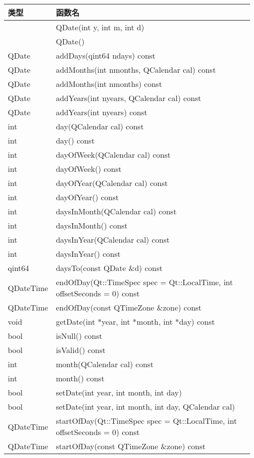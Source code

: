 \begin{longtable}{|l|m{30em}|}
\hline
类型	&函数名\\
\hline
&QDate(int y, int m, int d)\\
\hline
&QDate()\\
\hline
QDate&	addDays(qint64 ndays) const\\
\hline
QDate&	addMonths(int nmonths, QCalendar cal) const\\
\hline
QDate&	addMonths(int nmonths) const\\
\hline
QDate&	addYears(int nyears, QCalendar cal) const\\
\hline
QDate&	addYears(int nyears) const\\
\hline
int&	day(QCalendar cal) const\\
\hline
int&	day() const\\
\hline
int&	dayOfWeek(QCalendar cal) const\\
\hline
int&	dayOfWeek() const\\
\hline
int&	dayOfYear(QCalendar cal) const\\
\hline
int&	dayOfYear() const\\
\hline
int&	daysInMonth(QCalendar cal) const\\
\hline
int&	daysInMonth() const\\
\hline
int&	daysInYear(QCalendar cal) const\\
\hline
int&	daysInYear() const\\
\hline
qint64&	daysTo(const QDate \&d) const\\
\hline
QDateTime&	endOfDay(Qt::TimeSpec spec = Qt::LocalTime, int offsetSeconds = 0) const\\
\hline
QDateTime&	endOfDay(const QTimeZone \&zone) const\\
\hline
void&	getDate(int *year, int *month, int *day) const\\
\hline
bool&	isNull() const\\
\hline
bool&	isValid() const\\
\hline
int&	month(QCalendar cal) const\\
\hline
int&	month() const\\
\hline
bool&	setDate(int year, int month, int day)\\
\hline
bool&	setDate(int year, int month, int day, QCalendar cal)\\
\hline
QDateTime&	startOfDay(Qt::TimeSpec spec = Qt::LocalTime, int offsetSeconds = 0) const\\
\hline
QDateTime&	startOfDay(const QTimeZone \&zone) const\\

\end{longtable}
